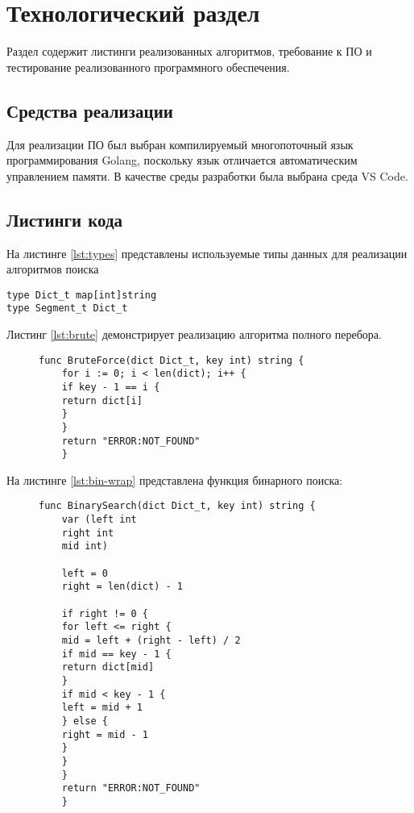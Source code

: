 \chapter{Технологический раздел}\label{sec:impl}

Раздел содержит листинги реализованных алгоритмов, требование к ПО
и тестирование реализованного программного обеспечения.

\section{Средства реализации} 
Для реализации ПО был выбран компилируемый многопоточный язык программирования Golang\cite{go}, поскольку язык отличается автоматическим управлением памяти. В качестве среды разработки была выбрана среда VS Code.

\section{Листинги кода}

На листинге \ref{lst:types} представлены используемые типы данных для реализации алгоритмов поиска

\captionsetup{singlelinecheck = false, justification=raggedright}
\begin{lstlisting}[label=lst:types,caption=Структуры данных]
type Dict_t map[int]string
type Segment_t Dict_t
\end{lstlisting}
Листинг \ref{lst:brute} демонстрирует реализацию алгоритма полного перебора.
\captionsetup{singlelinecheck = false, justification=raggedright}
\begin{figure}[H]
	\begin{lstlisting}[label=lst:brute,caption=Полный перебор]
	func BruteForce(dict Dict_t, key int) string {
	for i := 0; i < len(dict); i++ {
	if key - 1 == i {
	return dict[i]
	}
	} 
	return "ERROR:NOT_FOUND"
	}
	\end{lstlisting}
\end{figure}

На листинге \ref{lst:bin-wrap} представлена функция бинарного поиска:

\begin{figure}[H]
	\begin{lstlisting}[label=lst:bin-wrap,caption=Бинарный поиск]
	func BinarySearch(dict Dict_t, key int) string {
	var (left int
	right int
	mid int)
	
	left = 0
	right = len(dict) - 1
	
	if right != 0 {
	for left <= right {
	mid = left + (right - left) / 2
	if mid == key - 1 {
	return dict[mid]
	}
	if mid < key - 1 {
	left = mid + 1
	} else {
	right = mid - 1
	}
	}
	}
	return "ERROR:NOT_FOUND"
	}
	\end{lstlisting}
\end{figure}

